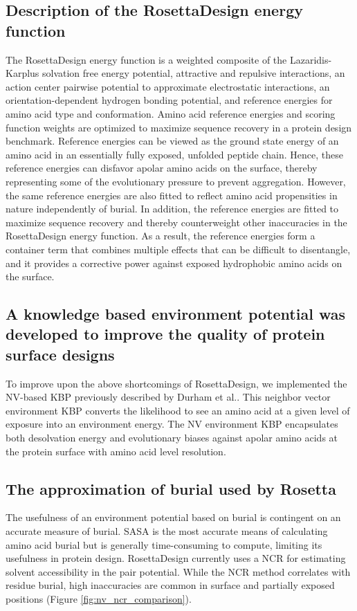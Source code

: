 \subsection{Description of the RosettaDesign energy function}
The RosettaDesign energy function is a weighted composite of the Lazaridis-Karplus solvation free energy potential, attractive and repulsive interactions, an action center pairwise potential to approximate electrostatic interactions, an orientation-dependent hydrogen bonding potential\citep{Kortemme:2003td}, and reference energies for amino acid type and conformation\citep{Dantas:2003vt}. 
Amino acid reference energies and scoring function weights are optimized to maximize sequence recovery in a protein design benchmark.
Reference energies can be viewed as the ground state energy of an amino acid in an essentially fully exposed, unfolded peptide chain.
Hence, these reference energies can disfavor apolar amino acids on the surface, thereby representing some of the evolutionary pressure to prevent aggregation.
However, the same reference energies are also fitted to reflect amino acid propensities in nature independently of burial.
In addition, the reference energies are fitted to maximize sequence recovery and thereby counterweight other inaccuracies in the RosettaDesign energy function.
As a result, the reference energies form a container term that combines multiple effects that can be difficult to disentangle, and it provides a corrective power against exposed hydrophobic amino acids on the surface.

\subsection{A knowledge based environment potential was developed to improve the quality of protein surface designs}
To improve upon the above shortcomings of RosettaDesign, we implemented the \acf{NV}-based \ac{KBP} previously described by Durham et al.\citep{Durham:2009kt}.
This neighbor vector environment \ac{KBP} converts the likelihood to see an amino acid at a given level of exposure into an environment energy.
The \ac{NV} environment \ac{KBP} encapsulates both desolvation energy and evolutionary biases against apolar amino acids at the protein surface with amino acid level resolution.

\subsection{The approximation of burial used by Rosetta }
The usefulness of an environment potential based on burial is contingent on an accurate measure of burial.
\ac{SASA} is the most accurate means of calculating amino acid burial but is generally time-consuming to compute, limiting its usefulness in protein design.
RosettaDesign currently uses a \ac{NCR} for estimating solvent accessibility in the pair potential.
While the \ac{NCR} method correlates with residue burial, high inaccuracies are common in surface and partially exposed positions (Figure \ref{fig:nv_ncr_comparison}). 

